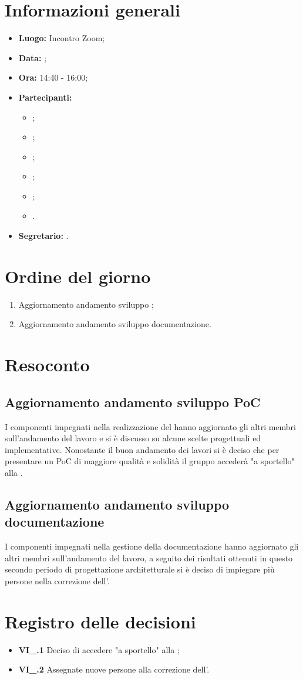 \section{Informazioni generali}
\begin{itemize}
	\item \textbf{Luogo:} Incontro Zoom;
	\item \textbf{Data:} \Data;
	\item \textbf{Ora:} 14:40 - 16:00;
	\item \textbf{Partecipanti:}
	\begin{itemize}
		\item \BL{}; 
		\item \FF{};
		\item \MM{}; 
		\item \PC{};
		\item \TG{};
		\item \TL{}.
	\end{itemize} 
	\item \textbf{Segretario:} \TG{}.
\end{itemize}

\section{Ordine del giorno}
\begin{enumerate}
	\item Aggiornamento andamento sviluppo ;
	\item Aggiornamento andamento sviluppo documentazione.
\end{enumerate}

\section{Resoconto}
\subsection{Aggiornamento andamento sviluppo PoC}
I componenti impegnati nella realizzazione del  hanno aggiornato gli altri membri sull'andamento del lavoro e si è discusso su alcune scelte progettuali ed implementative. Nonostante il buon andamento dei lavori si è deciso che per presentare un PoC di maggiore qualità e solidità il gruppo accederà "a sportello" alla .
\subsection{Aggiornamento andamento sviluppo documentazione}
I componenti impegnati nella gestione della documentazione hanno aggiornato gli altri membri sull'andamento del lavoro, a seguito dei risultati ottenuti in questo secondo periodo di progettazione architetturale si è deciso di impiegare più persone nella correzione dell'\AdR{}.

\section{Registro delle decisioni}
\begin{itemize}
	\item \textbf{VI\_\Data.1} Deciso di accedere "a sportello" alla ;
	\item \textbf{VI\_\Data.2} Assegnate nuove persone alla correzione dell'\AdR{}.
\end{itemize}
